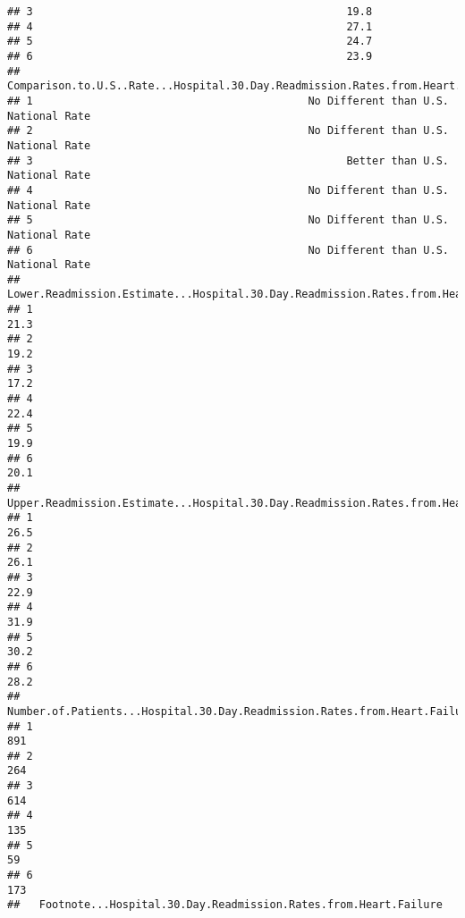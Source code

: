 \documentclass[
]{article}
\begin{document}
\begin{verbatim}
## 3                                                 19.8
## 4                                                 27.1
## 5                                                 24.7
## 6                                                 23.9
##   Comparison.to.U.S..Rate...Hospital.30.Day.Readmission.Rates.from.Heart.Failure
## 1                                           No Different than U.S. National Rate
## 2                                           No Different than U.S. National Rate
## 3                                                 Better than U.S. National Rate
## 4                                           No Different than U.S. National Rate
## 5                                           No Different than U.S. National Rate
## 6                                           No Different than U.S. National Rate
##   Lower.Readmission.Estimate...Hospital.30.Day.Readmission.Rates.from.Heart.Failure
## 1                                                                              21.3
## 2                                                                              19.2
## 3                                                                              17.2
## 4                                                                              22.4
## 5                                                                              19.9
## 6                                                                              20.1
##   Upper.Readmission.Estimate...Hospital.30.Day.Readmission.Rates.from.Heart.Failure
## 1                                                                              26.5
## 2                                                                              26.1
## 3                                                                              22.9
## 4                                                                              31.9
## 5                                                                              30.2
## 6                                                                              28.2
##   Number.of.Patients...Hospital.30.Day.Readmission.Rates.from.Heart.Failure
## 1                                                                       891
## 2                                                                       264
## 3                                                                       614
## 4                                                                       135
## 5                                                                        59
## 6                                                                       173
##   Footnote...Hospital.30.Day.Readmission.Rates.from.Heart.Failure

\end{verbatim}
\end{document}
